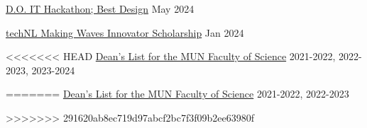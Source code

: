 \href{https://github.com/EthanDenny/do-it-hackathon}{D.O. IT Hackathon; Best Design} \hfill May 2024 \par
\href{https://technl.ca/}{techNL Making Waves Innovator Scholarship} \hfill Jan 2024 \par
<<<<<<< HEAD
\href{https://www.mun.ca/science/undergraduates/scholarships-and-awards/deans-list/}{Dean's List for the MUN Faculty of Science} \hfill 2021-2022, 2022-2023, 2023-2024 \par
=======
\href{https://www.mun.ca/science/undergraduates/scholarships-and-awards/deans-list/}{Dean's List for the MUN Faculty of Science} \hfill 2021-2022, 2022-2023 \par
>>>>>>> 291620ab8ec719d97abcf2bc7f3f09b2ee63980f
